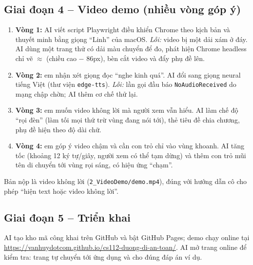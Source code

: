 \documentclass[12pt,a4paper]{report}
\newcommand{\demo}{\url{https://vanhuydotcom.github.io/cs112-duong-di-an-toan/}}
\begin{document}
\subsection*{Giai đoạn 4 -- Video demo (nhiều vòng góp ý)}
\begin{enumerate}
  \item \textbf{Vòng 1:} AI viết script Playwright điều khiển Chrome theo kịch bản và thuyết minh bằng giọng ``Linh'' của macOS. \emph{Lỗi:} video bị một dải xám ở đáy. AI dùng một trang thử có dải màu chuyển để đo, phát hiện Chrome headless chỉ vẽ $\approx$ (chiều cao $-$ 86px), bèn cắt video và đẩy phụ đề lên.
  \item \textbf{Vòng 2:} em nhận xét giọng đọc ``nghe kinh quá''. AI đổi sang giọng neural tiếng Việt (thư viện \texttt{edge-tts}). \emph{Lỗi:} lần gọi đầu báo \texttt{NoAudioReceived} do mạng chập chờn; AI thêm cơ chế thử lại.
  \item \textbf{Vòng 3:} em muốn video không lời mà người xem vẫn hiểu. AI làm chế độ ``rọi đèn'' (làm tối mọi thứ trừ vùng đang nói tới), thẻ tiêu đề chia chương, phụ đề hiện theo độ dài chữ.
  \item \textbf{Vòng 4:} em góp ý video chậm và cần con trỏ chỉ vào vùng khoanh. AI tăng tốc (khoảng 12 ký tự/giây, người xem có thể tạm dừng) và thêm con trỏ mũi tên di chuyển tới vùng rọi sáng, có hiệu ứng ``chạm''.
\end{enumerate}
Bản nộp là video không lời (\texttt{2\_VideoDemo/demo.mp4}), đúng với hướng dẫn cô cho phép ``hiện text hoặc video không lời''.

\subsection*{Giai đoạn 5 -- Triển khai}
AI tạo kho mã công khai trên GitHub và bật GitHub Pages; demo chạy online tại \demo. AI mở trang online để kiểm tra: trang tự chuyển tới ứng dụng và cho đúng đáp án ví dụ.
\end{document}

